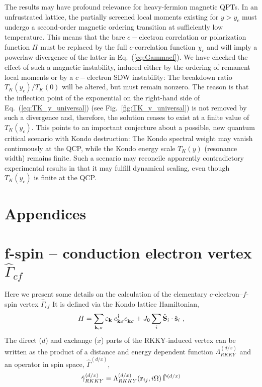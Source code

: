 \documentclass[12pt,twoside]{article}
\newcommand{\phdagger}{{\phantom{\dagger}}}
\newcommand{\Eq}[1]{Eq.~(\ref{#1})}
\begin{document}
The results may have profound relevance for heavy-fermion magnetic QPTs. 
In an unfrustrated lattice, the partially screened 
local moments existing for $y>y_c$ must undergo a second-order 
magnetic ordering transition at sufficiently low temperature. 
This means that the bare $c-$electron correlation or polarization function 
$\Pi$ must be replaced by the full $c$-correlation function $\chi_c$ 
and will imply a powerlaw divergence of the latter in \Eq{eq:Gammacf}. 
We have checked the effect of such a  
magnetic instability, induced either by the ordering of remanent 
local moments or by a $c-$electron SDW instability: 
The breakdown ratio $T_K(y_c)/T_K(0)$ will be altered, but must 
remain nonzero. The reason is that the inflection point of the exponential 
on the right-hand side of \Eq{eq:TK_y_universal} 
(see Fig.~\ref{fig:TK_y_universal}) is not removed by such 
a divergence and, therefore, the solution ceases to exist at a finite 
value of $T_K(y_c)$.
This points to an important conjecture about a possible, new quantum 
critical scenario with Kondo destruction: The Kondo spectral weight may
vanish continuously at the QCP, while the Kondo energy scale $T_K(y)$ 
(resonance width) remains finite.
Such a scenario may reconcile apparently contradictory experimental results
in that it may fulfill dynamical scaling, even  
though $T_K(y_c)$ is finite at the QCP. 






\newpage %
\section*{Appendices}
\appendix
\section{f-spin -- conduction electron vertex $\hat\Gamma_{cf}$}
\label{sec:cfvertex}

Here we present some details on the calculation of the 
elementary $c$-electron--$f$-spin vertex $\hat\Gamma_{cf}$ 
It is defined via the Kondo lattice Hamiltonian, 
\begin{equation}
H = \sum_{{\bf k},\sigma} 
\varepsilon_{\bf k} \; c_{{\bf k} \sigma}^\dagger c_{{\bf k} \sigma}^\phdagger +
J_0 \sum_{i} \hat{{\bf S}}_i \cdot \hat{{\bf s}}_i  \ ,
\label{S_Hamiltonian}
\end{equation}
The direct ($d$) and exchange ($x$) parts of the RKKY-induced vertex 
can be written as the product of a distance and energy dependent 
function $\Lambda_{RKKY}^{(d/x)}$ and an operator in spin space, 
$\hat\Gamma^{(d/x)}$,
\begin{equation} 
\hat\gamma_{RKKY}^{(d/x)}= \Lambda_{RKKY}^{(d/x)}({\bf r}_{ij},i\Omega) \,
\hat\Gamma^{(d/x)}
\label{eq:RKKYvertex}
\end{equation}
\end{document}
